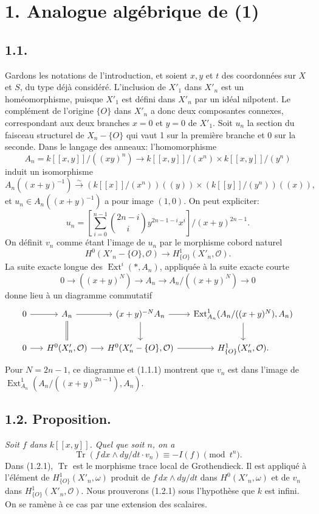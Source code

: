 \documentclass[11pt,leqno]{article}
\DeclareMathOperator{\Ext}{Ext}
\DeclareMathOperator{\Tr}{Tr}
\newcommand{\OO}{\mathcal O}
\begin{document}
\section*{1. Analogue algébrique de (1)}

\subsection*{1.1.}
Gardons les notations de l'introduction, et soient $x,y$ et $t$ des coordonnées sur $X$ et $S$, du type déjà considéré.
\clearpage
L'inclusion de $X'_1$ dans $X'_n$ est un homéomorphisme, puisque $X'_1$ est défini dans $X'_n$ par un idéal nilpotent. Le complément de l'origine $\{O\}$ dans $X'_n$ a donc deux composantes connexes, correspondant aux deux branches $x=0$ et $y=0$ de $X'_1$. Soit $u_n$ la section du faisceau structurel de $X_n-\{O\}$ qui vaut 1 sur la première branche et 0 sur la seconde. Dans le langage des anneaux: l'homomorphisme
\[
        A_n=k[[x,y]]/((xy)^n)\longrightarrow k[[x,y]]/(x^n)\times k[[x,y]]/(y^n)
\]
induit un isomorphisme
\[
        A_n((x+y)^{-1})\xrightarrow{\sim}
        (k[[x]]/(x^n))((y))\times(k[[y]]/(y^n))((x)),
\]
et $u_n\in A_n((x+y)^{-1})$ a pour image $(1,0)$. On peut expliciter:
\begin{equation}
        u_n=\left[\sum_{i=0}^{n-1}\binom{2n-i}{i}y^{2n-1-i}x^i\right]\big/(x+y)^{2n-1}. \tag{1.1.1}
\end{equation}
On définit $v_n$ comme étant l'image de $u_n$ par le morphisme cobord naturel
\[
        H^0(X'_n-\{O\},\OO)\longrightarrow H^1_{\{O\}}(X'_n,\OO).
\]
La suite exacte longue des $\Ext^i(*,A_n)$, appliquée à la suite exacte courte
\[
        0\longrightarrow ((x+y)^N)\longrightarrow A_n\longrightarrow A_n/((x+y)^N)\longrightarrow0
\]
donne lieu à un diagramme commutatif
\[
\begin{tikzcd}[column sep=1.5em,row sep=2.1em]
0 \arrow[r] & A_n \arrow[r] \arrow[d,equal] &
(x+y)^{-N}A_n \arrow[r] \arrow[d] &
\Ext^1_{A_n}(A_n/((x+y)^N),A_n) \arrow[d] \\
0 \arrow[r] & H^0(X'_n,\OO) \arrow[r] &
H^0(X'_n-\{O\},\OO) \arrow[r] & H^1_{\{O\}}(X'_n,\OO).
\end{tikzcd}
\]
Pour $N=2n-1$, ce diagramme et (1.1.1) montrent que $v_n$ est dans l'image de $\Ext^1_{A_n}(A_n/((x+y)^{2n-1}),A_n)$.

\subsection*{1.2. Proposition.}
\emph{Soit $f$ dans $k[[x,y]]$. Quel que soit $n$, on a}
\begin{equation}
        \Tr(f\,dx\wedge dy/dt\cdot v_n)\equiv -I(f)\pmod {t^n}. \tag{1.2.1}
\end{equation}
Dans (1.2.1), $\Tr$ est le morphisme trace local de Grothendieck. Il est appliqué à l'élément de $H^1_{\{O\}}(X'_n,\omega)$ produit de $f\,dx\wedge dy/dt$ dans $H^0(X'_n,\omega)$ et de $v_n$ dans $H^1_{\{O\}}(X'_n,\OO)$. Nous prouverons (1.2.1) sous l'hypothèse que $k$ est infini. On se ramène à ce cas par une extension des scalaires.
\end{document}
